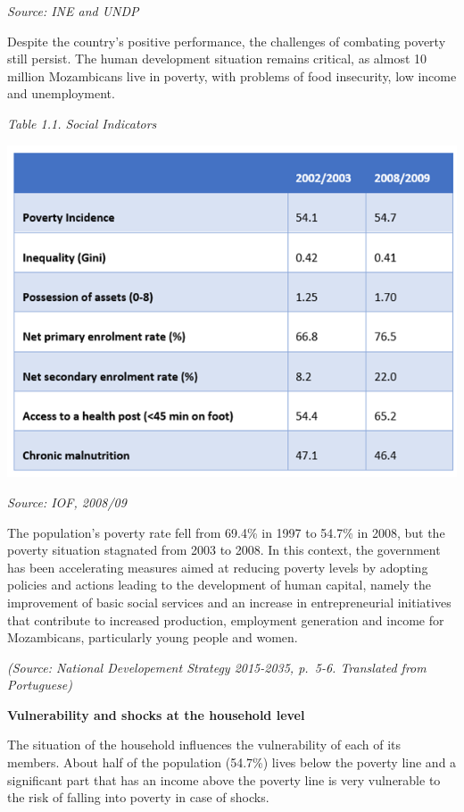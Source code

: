 \documentclass[
]{book}
\begin{document}
\emph{Source: INE and UNDP}

Despite the country's positive performance, the challenges of combating poverty still persist. The human development situation remains critical, as almost 10 million Mozambicans live in poverty, with problems of food insecurity, low income and unemployment.

\emph{Table 1.1. Social Indicators}

\includegraphics{Figure10.png}

\emph{Source: IOF, 2008/09}

The population's poverty rate fell from 69.4\% in 1997 to 54.7\% in 2008, but the poverty situation stagnated from 2003 to 2008. In this context, the government has been accelerating measures aimed at reducing poverty levels by adopting policies and actions leading to the development of human capital, namely the improvement of basic social services and an increase in entrepreneurial initiatives that contribute to increased production, employment generation and income for Mozambicans, particularly young people and women.

\emph{(Source: National Developement Strategy 2015-2035, p.~5-6. Translated from Portuguese)}

\textbf{Vulnerability and shocks at the household level}

The situation of the household influences the vulnerability of each of its members. About half of the population (54.7\%) lives below the poverty line and a significant part that has an income above the poverty line is very vulnerable to the risk of falling into poverty in case of shocks.
\end{document}

